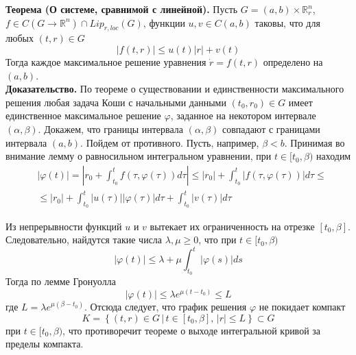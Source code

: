 \textbf{Теорема (О системе, сравнимой с линейной).} Пусть $G = (a,b) \times \mathbb{R}_r^n$, $f \in C(G \to \mathbb{R}^n) \cap Lip_{r,loc}(G)$, функции $u,v \in C(a,b)$ таковы, что для любых $(t,r) \in G$
\begin{equation*}
    |f(t,r)| \le u(t)|r| + v(t)
\end{equation*}
Тогда каждое максимальное решение уравнения $\dot{r} = f(t,r)$ определено на $(a,b)$.\\

\noindent \textbf{Доказательство.} По теореме о существовании и единственности максимального решения любая задача Коши с начальными данными $(t_0, r_0) \in G$ имеет единственное максимальное решение $\varphi$, заданное на некотором интервале $(\alpha, \beta)$. Докажем, что границы интервала $(\alpha, \beta)$ совпадают с границами интервала $(a,b)$. Пойдем от противного. Пусть, например, $\beta < b$. Принимая во внимание лемму о равносильном интегральном уравнении, при $t \in [t_0, \beta)$ находим
\begin{equation*}
    \begin{aligned}
        &|\varphi(t)| = \left|r_0 + \int_{t_0}^t f(\tau, \varphi(\tau))d\tau \right| \le |r_0| + \int_{t_0}^t |f(\tau, \varphi(\tau))|d\tau \le\\
        &\le |r_0| + \int_{t_0}^t |u(\tau)||\varphi(\tau)|d\tau + \int_{t_0}^t |v(\tau)|d\tau
    \end{aligned}
\end{equation*}

Из непрерывности функций $u$ и $v$ вытекает их ограниченность на отрезке $[t_0, \beta]$. Следовательно, найдутся такие числа $\lambda, \mu \ge 0$, что при $t \in [t_0, \beta)$
\begin{equation*}
    |\varphi(t)| \le \lambda + \mu \int_{t_0}^t |\varphi(s)|ds
\end{equation*}
Тогда по лемме Гронуолла
\begin{equation*}
    |\varphi(t)| \le \lambda e^{\mu (t - t_0)} \le L
\end{equation*}
где $L = \lambda e^{\mu (\beta - t_0)}$. Отсюда следует, что график решения $\varphi$ не покидает компакт
\begin{equation*}
    K = \left\{(t,r) \in G\, |\, t \in [t_0, \beta],\, |r| \le L \right\} \subset G
\end{equation*}
при $t \in [t_0, \beta)$, что противоречит теореме о выходе интегральной кривой за пределы компакта.\\

